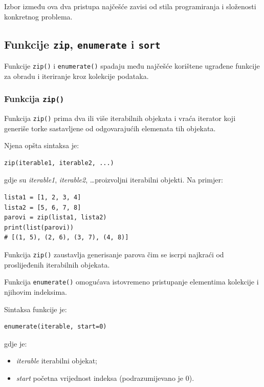 Izbor između ova dva pristupa najčešće zavisi od stila programiranja i složenosti konkretnog problema.


\subsection{Funkcije \texttt{zip}, \texttt{enumerate} i \texttt{sort}}

Funkcije \texttt{zip()} i \texttt{enumerate()} spadaju među najčešće korištene ugrađene funkcije za obradu i iteriranje kroz kolekcije podataka.

\subsubsection*{Funkcija \texttt{zip()}}

Funkcija \texttt{zip()} prima dva ili više iterabilnih objekata i vraća iterator koji generiše torke sastavljene od odgovarajućih elemenata tih objekata.

Njena opšta sintaksa je:
\begin{verbatim}
zip(iterable1, iterable2, ...)
\end{verbatim}

gdje su \textit{iterable1}, \textit{iterable2}, \ldots proizvoljni iterabilni objekti. Na primjer:

\begin{verbatim}
lista1 = [1, 2, 3, 4]
lista2 = [5, 6, 7, 8]
parovi = zip(lista1, lista2)
print(list(parovi))
# [(1, 5), (2, 6), (3, 7), (4, 8)]
\end{verbatim}

Funkcija \texttt{zip()} zaustavlja generisanje parova čim se iscrpi najkraći od proslijeđenih iterabilnih objekata.


Funkcija \texttt{enumerate()} omogućava istovremeno pristupanje elementima kolekcije i njihovim indeksima.

Sintaksa funkcije je:

\begin{verbatim}
enumerate(iterable, start=0)
\end{verbatim}

gdje je:

\begin{itemize}
	\item \textit{iterable} iterabilni objekat;
	\item \textit{start} početna vrijednost indeksa (podrazumijevano je 0).
\end{itemize}


